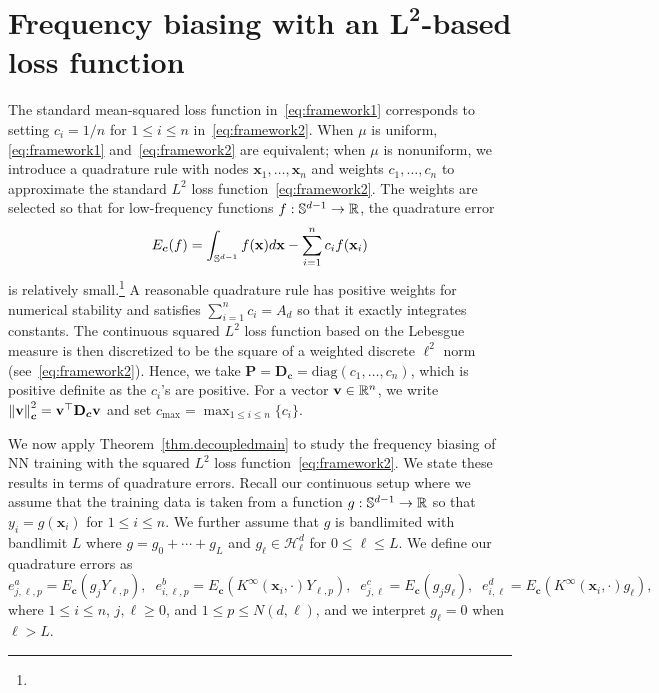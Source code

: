 \documentclass{article} %
\begin{document}
\section{Frequency biasing with an $\mathbf{L^2}$-based loss function}\label{sec:L2}
The standard mean-squared loss function in~\cref{eq:framework1} corresponds to setting $c_i = 1/n$ for $1\leq i\leq n$ in~\cref{eq:framework2}. When $\mu$ is uniform, \cref{eq:framework1} and~\cref{eq:framework2} are equivalent; when $\mu$ is nonuniform, we introduce a quadrature rule with nodes $\mathbf{x}_1,\ldots,\mathbf{x}_n$ and weights $c_1,\ldots,c_n$ to approximate the standard $L^2$ loss function~\cref{eq:framework2}. The weights are selected so that for low-frequency functions $f:{\mathbb{S}}^{d-1}\rightarrow\mathbb{R}$, the quadrature error 
\begin{equation} \label{eq:QuadratureRule} 
E_{\boldsymbol{c}}(f) = \int_{{\mathbb{S}}^{d-1}} f(\mathbf{x}) d\mathbf{x} - \sum_{i=1}^n c_i f(\mathbf{x}_i)
\end{equation} 
is relatively small.\footnote{}
A reasonable quadrature rule has positive weights for numerical stability and satisfies $\sum_{i=1}^n c_i = A_d$ so that it exactly integrates constants. The continuous squared $L^2$ loss function based on the Lebesgue measure is then discretized to be the square of a weighted discrete $\ell^2$ norm (see~\cref{eq:framework2}). Hence, we take $\mathbf{P} = \mathbf{D}_{\boldsymbol{c}} = \text{diag}(c_1, \ldots, c_n)$, which is positive definite as the $c_i$'s are positive. For a vector $\mathbf{v} \in \mathbb{R}^n$, we write $\left\lVert\mathbf{v}\right\rVert_{\boldsymbol{c}}^2 = \mathbf{v}^\top \mathbf{D}_{\boldsymbol{c}}\mathbf{v}$ and set $c_{\text{max}} = \max_{1\leq i\leq n} \{c_i\}$. 

We now apply Theorem~\ref{thm.decoupledmain} to study the frequency biasing of NN training with the squared $L^2$ loss function~\cref{eq:framework2}. We state these results in terms of quadrature errors. Recall our continuous setup where we assume that the training data is taken from a function $g:{\mathbb{S}}^{d-1}\rightarrow \mathbb{R}$ so that $y_i = g(\mathbf{x}_i)$ for $1\leq i\leq n$. We further assume that $g$ is bandlimited with bandlimit $L$ where $g = g_0 + \cdots + g_L$ and $g_\ell \in \mathcal{H}_\ell^d$ for $0 \leq \ell \leq L$. We define our quadrature errors as 
\begin{equation} 
    e^a_{j,\ell,p} \!=\! E_{\boldsymbol{c}}(g_j Y_{\ell,p}), \;\; e^b_{i,\ell,p} \!=\! E_{\boldsymbol{c}}(\!K^\infty\!(\mathbf{x}_i, \cdot) Y_{\ell,p}), \;\;
    e^c_{j,\ell}
    \!=\! E_{\boldsymbol{c}}(g_j g_{\ell}), \;\; e^d_{i,\ell} 
    \!=\! E_{\boldsymbol{c}}(\!K^\infty\!(\mathbf{x}_i, \cdot) g_{\ell}),
\label{eq:QuadratureErrors} 
\end{equation} 
where $1 \leq i \leq n$, $j, \ell \geq 0$, and $1 \leq p \leq N(d,\ell)$, and we interpret $g_\ell = 0$ when $\ell > L$.
\end{document}
